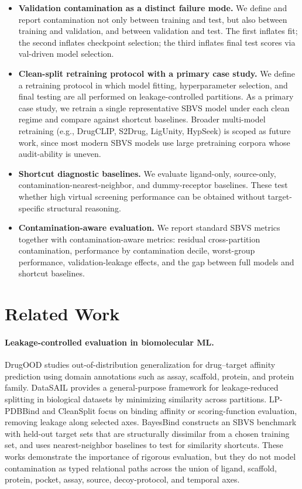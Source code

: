 \documentclass[11pt]{article}
\begin{document}
\begin{itemize}[leftmargin=*]
    \item \textbf{Validation contamination as a distinct failure mode.}
    We define and report contamination not only between training and test, but also between training and validation, and between validation and test. The first inflates fit; the second inflates checkpoint selection; the third inflates final test scores via val-driven model selection.

    \item \textbf{Clean-split retraining protocol with a primary case study.}
    We define a retraining protocol in which model fitting, hyperparameter selection, and final testing are all performed on leakage-controlled partitions. As a primary case study, we retrain a single representative SBVS model under each clean regime and compare against shortcut baselines. Broader multi-model retraining (e.g., DrugCLIP, S2Drug, LigUnity, HypSeek) is scoped as future work, since most modern SBVS models use large pretraining corpora whose audit-ability is uneven.

    \item \textbf{Shortcut diagnostic baselines.}
    We evaluate ligand-only, source-only, contamination-nearest-neighbor, and dummy-receptor baselines. These test whether high virtual screening performance can be obtained without target-specific structural reasoning.

    \item \textbf{Contamination-aware evaluation.}
    We report standard SBVS metrics together with contamination-aware metrics: residual cross-partition contamination, performance by contamination decile, worst-group performance, validation-leakage effects, and the gap between full models and shortcut baselines.
\end{itemize}

\section{Related Work}

\paragraph{Leakage-controlled evaluation in biomolecular ML.}
DrugOOD studies out-of-distribution generalization for drug--target affinity prediction using domain annotations such as assay, scaffold, protein, and protein family. DataSAIL provides a general-purpose framework for leakage-reduced splitting in biological datasets by minimizing similarity across partitions. LP-PDBBind and CleanSplit focus on binding affinity or scoring-function evaluation, removing leakage along selected axes. BayesBind constructs an SBVS benchmark with held-out target sets that are structurally dissimilar from a chosen training set, and uses nearest-neighbor baselines to test for similarity shortcuts. These works demonstrate the importance of rigorous evaluation, but they do not model contamination as typed relational paths across the union of ligand, scaffold, protein, pocket, assay, source, decoy-protocol, and temporal axes.
\end{document}
